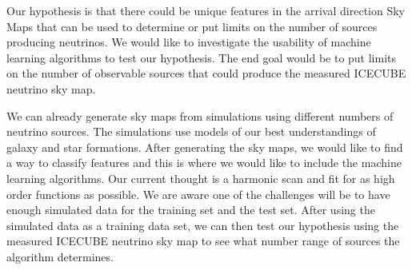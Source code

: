 \documentclass[a4paper,12pt,twoside,openright]{article}
\begin{document}
Our hypothesis is that there could be unique features in the arrival direction Sky Maps that can be used to determine or put limits on the number of sources producing neutrinos. We would like to investigate the usability of machine learning algorithms to test our hypothesis. The end goal would be to put limits on the number of observable sources that could produce the measured ICECUBE neutrino sky map.


We can already generate sky maps from simulations using different numbers of neutrino sources. The simulations use models of our best understandings of galaxy and star formations. After generating the sky maps, we would like to find a way to classify features and this is where we would like to include the machine learning algorithms. Our current thought is a harmonic scan and fit for as high order functions as possible. We are aware one of the challenges will be to have enough simulated data for the training set and the test set. After using the simulated data as a training data set, we can then test our hypothesis using the measured ICECUBE neutrino sky map to see what number range of sources the algorithm determines.


\end{document}
